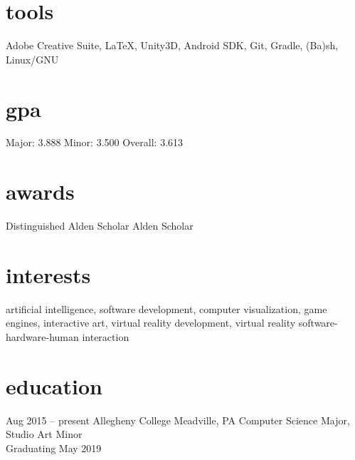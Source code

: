 \documentclass[]{friggeri-cv}
\begin{document}
\begin{aside}
  \section{tools}\vspace{0.05cm}
    Adobe Creative Suite, \LaTeX , Unity3D, Android SDK, Git, Gradle, (Ba)sh, Linux/GNU
  \section{gpa}\vspace{0.1cm}
  	Major: 3.888
  	Minor: 3.500
    Overall: 3.613\vspace{0.1cm}
  \section{awards}\vspace{0.05cm}
  Distinguished Alden Scholar\vspace{0.1cm}
  Alden Scholar\vspace{0.1cm}
\end{aside}

\section{interests}

artificial intelligence, software development, computer visualization, game engines, interactive art, virtual reality development, virtual reality software-hardware-human interaction

\section{education}
\begin{entrylist}
  \entry
    {Aug 2015 -- present}
    {Allegheny College}
    {Meadville, PA}
    {Computer Science Major, Studio Art Minor\\Graduating May 2019}
\end{entrylist}
\end{document}
